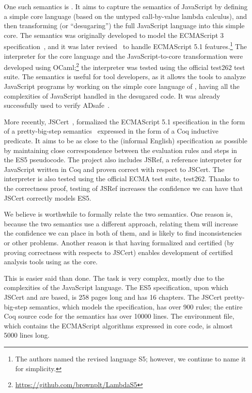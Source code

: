 \documentclass{llncs}
\begin{document}
One such semantics is \lambdajs. It aims to capture
the semantics of JavaScript by defining a simple core language
(based on the untyped call-by-value lambda calculus), and then
transforming (or ``desugaring'') the full JavaScript language into this
simple core. The \lambdajs semantics was originally developed to model the 
ECMAScript 3 specification~\citep{Guha-al:ECOOP10}, and it was later
revised~\citep{Politz-al:DLS12} to handle ECMAScript 5.1
features.\footnote{The authors named the revised language S5; however,
we continue to name it \lambdajs for simplicity.}
The interpreter for the core language and the JavaScript-to-core
transformation were developed using 
OCaml;\footnote{\url{https://github.com/brownplt/LambdaS5}}
the interpreter was tested using the official test262 test suite.
The \lambdajs semantics is useful for tool developers, as it
allows the tools to analyze JavaScript programs by working
on the simple core language of \lambdajs, having all the complexities
of JavaScript handled in the desugared code. It was already
successfully used to verify ADsafe~\citep{Politz-al:SEC11}.

More recently, JSCert~\citep{Bodin-al:POPL14},
formalized the ECMAScript 5.1 specification in the form of
a pretty-big-step semantics~\citep{Chargueraud:ESOP13} expressed in 
the form of a Coq inductive predicate. It aims to be as close to the
(informal English) specification as possible by maintaining close correspondence
between the evaluation rules and steps in the ES5 pseudocode. The project
also includes JSRef, a reference interpreter for JavaScript written in Coq
and proven correct with respect to JSCert. The interpreter is also tested
using the official ECMA test suite, test262. Thanks to the correctness proof,
testing of JSRef increases the confidence we can have that JSCert
correctly models ES5.

We believe is worthwhile to formally relate the two semantics. One reason is,
because the two semantics use a different approach, relating
them will increase the confidence we can place in both of them,
and is likely to find inconsistencies or other problems. Another reason is
that having \lambdajs formalized and certified (by proving correctness
with respects to JSCert) enables development of certified analysis tools
using \lambdajs as the core.

This is easier said than done. The task is very complex, mostly due
to the complexities of the JavaScript language. The ES5 specification,
upon which JSCert and \lambdajs are based, is 258 pages long and 
has 16 chapters. The JSCert pretty-big-step semantics, which models
the specification, has over 900 rules; the entire Coq source code
for the semantics has over 10000 lines. The \lambdajs environment
file, which contains the ECMAScript algorithms expressed in core
\lambdajs code, is almost 5000 lines long.
\end{document}
